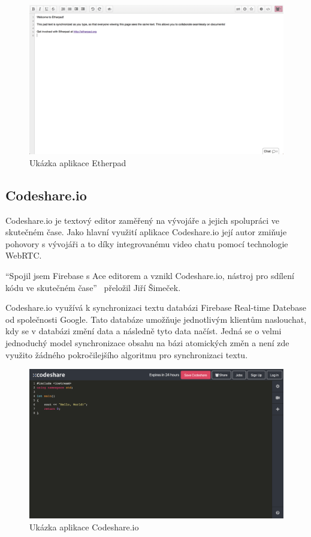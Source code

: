 \begin{figure}[ht]
    \centering
    \includegraphics[width=\textwidth]{partials/analyza/etherpad}
    \caption{Ukázka aplikace Etherpad}\label{fig:etherpad}
\end{figure}

\subsection{Codeshare.io}\label{subsec:codeshare.io}

Codeshare.io je textový editor zaměřený na vývojáře a jejich spolupráci ve skutečném čase.
Jako hlavní využití aplikace Codeshare.io její autor zmiňuje pohovory s vývojáři a to díky integrovanému video chatu pomocí technologie WebRTC.~\cite{codeshare:home}

\enquote{Spojil jsem Firebase s Ace editorem a vznikl Codeshare.io, nástroj pro sdílení kódu ve skutečném čase}~\cite{codeshare:created} přeložil Jiří Šimeček.

Codeshare.io využívá k synchronizaci textu databázi Firebase Real-time Datebase od společnosti Google.
Tato databáze umožňuje jednotlivým klientům naslouchat, kdy se v databázi změní data a následně tyto data načíst.
Jedná se o velmi jednoduchý model synchronizace obsahu na bázi atomických změn a není zde využito žádného pokročilejšího algoritmu pro synchronizaci textu.~\cite{codeshare:created}

\begin{figure}[ht]
    \centering
    \includegraphics[width=\textwidth]{partials/analyza/codeshare}
    \caption{Ukázka aplikace Codeshare.io}\label{fig:codeshare}
\end{figure}
